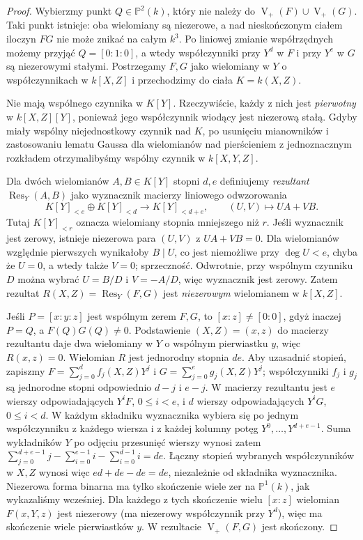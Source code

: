 \documentclass[11pt,a4paper,openany]{report}
\numberwithin{equation}{section}
\theoremstyle{plain}
\theoremstyle{definition}
\theoremstyle{remark}
\newcommand{\PP}{\mathbb P}
\newcommand{\V}{\operatorname V}
\begin{document}
\begin{proof}
Wybierzmy punkt $Q\in\PP^2(k)$, który nie należy do
$\V_+(F)\cup\V_+(G)$. Taki punkt istnieje:
oba wielomiany są niezerowe, a nad nieskończonym ciałem
iloczyn $FG$ nie może znikać na całym $k^3$.
Po liniowej zmianie współrzędnych możemy przyjąć
$Q=[0:1:0]$, a wtedy współczynniki przy $Y^d$ w $F$
i przy $Y^e$ w $G$ są niezerowymi stałymi.
Postrzegamy $F,G$ jako wielomiany w $Y$ o współczynnikach
w $k[X,Z]$ i przechodzimy do ciała $K=k(X,Z)$.

Nie mają wspólnego czynnika w $K[Y]$. Rzeczywiście,
każdy z nich jest \emph{pierwotny} w $k[X,Z][Y]$,
ponieważ jego współczynnik wiodący jest niezerową stałą.
Gdyby miały wspólny niejednostkowy czynnik nad $K$,
po usunięciu mianowników i zastosowaniu lematu Gaussa
dla wielomianów nad pierścieniem z jednoznacznym rozkładem
otrzymalibyśmy wspólny czynnik w $k[X,Y,Z]$.

Dla dwóch wielomianów $A,B\in K[Y]$ stopni $d,e$
definiujemy \emph{rezultant} $\operatorname{Res}_Y(A,B)$
jako wyznacznik macierzy liniowego odwzorowania
\[
 K[Y]_{<e}\oplus K[Y]_{<d}\longrightarrow K[Y]_{<d+e},
 \qquad (U,V)\longmapsto UA+VB.
\]
Tutaj $K[Y]_{<r}$ oznacza wielomiany stopnia mniejszego niż $r$.
Jeśli wyznacznik jest zerowy, istnieje niezerowa para
$(U,V)$ z $UA+VB=0$. Dla wielomianów względnie pierwszych
wynikałoby $B\mid U$, co jest niemożliwe przy $\deg U<e$,
chyba że $U=0$, a wtedy także $V=0$; sprzeczność.
Odwrotnie, przy wspólnym czynniku $D$ można wybrać
$U=B/D$ i $V=-A/D$, więc wyznacznik jest zerowy.
Zatem rezultat $R(X,Z)=\operatorname{Res}_Y(F,G)$
jest \emph{niezerowym} wielomianem w $k[X,Z]$.

Jeśli $P=[x:y:z]$ jest wspólnym zerem $F,G$, to
$[x:z]\ne[0:0]$, gdyż inaczej $P=Q$, a $F(Q)G(Q)\ne0$.
Podstawienie $(X,Z)=(x,z)$ do macierzy rezultantu
daje dwa wielomiany w $Y$ o wspólnym pierwiastku $y$,
więc $R(x,z)=0$.
Wielomian $R$ jest jednorodny stopnia $de$.
Aby uzasadnić stopień, zapiszmy
$F=\sum_{j=0}^d f_j(X,Z)Y^j$ i
$G=\sum_{j=0}^e g_j(X,Z)Y^j$; współczynniki $f_j$
i $g_j$ są jednorodne stopni odpowiednio $d-j$ i $e-j$.
W macierzy rezultantu jest $e$ wierszy odpowiadających
$Y^iF$, $0\le i<e$, i $d$ wierszy odpowiadających
$Y^iG$, $0\le i<d$. W każdym składniku wyznacznika
wybiera się po jednym współczynniku z każdego wiersza
i z każdej kolumny potęg $Y^0,\dots,Y^{d+e-1}$.
Suma wykładników $Y$ po odjęciu przesunięć wierszy
wynosi zatem
$\sum_{j=0}^{d+e-1}j-\sum_{i=0}^{e-1}i-\sum_{i=0}^{d-1}i=de$.
Łączny stopień wybranych współczynników w $X,Z$
wynosi więc $ed+de-de=de$, niezależnie od składnika
wyznacznika.
Niezerowa forma binarna ma tylko skończenie wiele zer na
$\PP^1(k)$, jak wykazaliśmy wcześniej. Dla każdego z tych
skończenie wielu $[x:z]$ wielomian $F(x,Y,z)$ jest
niezerowy (ma niezerowy współczynnik przy $Y^d$),
więc ma skończenie wiele pierwiastków $y$.
W rezultacie $\V_+(F,G)$ jest skończony.


\end{proof}
\end{document}
